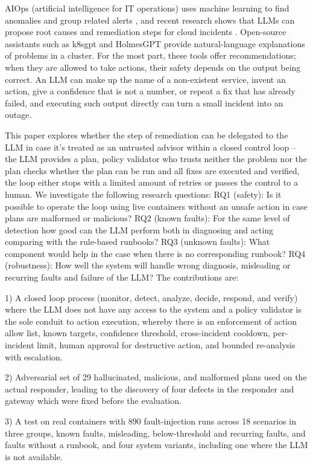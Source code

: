 \documentclass[conference,a4paper]{IEEEtran}
\begin{document}
AIOps (artificial intelligence for IT operations) uses machine learning to find anomalies and group related alerts \cite{b2}, and recent research shows that LLMs can propose root causes and remediation steps for cloud incidents \cite{b3,b4}. Open-source assistants such as k8sgpt \cite{b5} and HolmesGPT \cite{b6} provide natural-language explanations of problems in a cluster. For the most part, these tools offer recommendations; when they are allowed to take actions, their safety depends on the output being correct. An LLM can make up the name of a non-existent service, invent an action, give a confidence that is not a number, or repeat a fix that has already failed, and executing such output directly can turn a small incident into an outage.

This paper explores whether the step of remediation can be delegated to the LLM in case it's treated as an untrusted advisor within a closed control loop -- the LLM provides a plan, policy validator who trusts neither the problem nor the plan checks whether the plan can be run and all fixes are executed and verified, the loop either stops with a limited amount of retries or passes the control to a human. We investigate the following research questions: RQ1 (safety): Is it possible to operate the loop using live containers without an unsafe action in case plans are malformed or malicious? RQ2 (known faults): For the same level of detection how good can the LLM perform both in diagnosing and acting comparing with the rule-based runbooks? RQ3 (unknown faults): What component would help in the case when there is no corresponding runbook? RQ4 (robustness): How well the system will handle wrong diagnosis, misleading or recurring faults and failure of the LLM? The contributions are:

1) A closed loop process (monitor, detect, analyze, decide, respond, and verify) where the LLM does not have any access to the system and a policy validator is the sole conduit to action execution, whereby there is an enforcement of action allow list, known targets, confidence threshold, cross-incident cooldown, per-incident limit, human approval for destructive action, and bounded re-analysis with escalation.

2) Adversarial set of 29 hallucinated, malicious, and malformed plans used on the actual responder, leading to the discovery of four defects in the responder and gateway which were fixed before the evaluation.

3) A test on real containers with 890 fault-injection runs across 18 scenarios in three groups, known faults, misleading, below-threshold and recurring faults, and faults without a runbook, and four system variants, including one where the LLM is not available.
\end{document}
